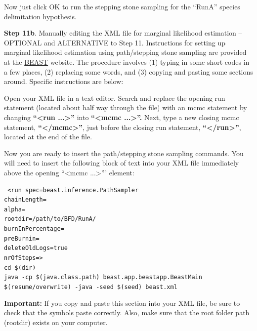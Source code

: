 {Now just click OK to run the stepping stone sampling for the ``RunA'' species delimitation hypothesis.

{\bf Step 11b}. Manually editing the XML file for marginal likelihood estimation -- OPTIONAL and ALTERNATIVE to Step 11. Instructions for setting up
marginal likelihood estimation using path/stepping stone sampling are provided at the \href{http://www.beast2.org/path-sampling/}{BEAST} website. The procedure involves (1) typing in some short codes in a few places, (2) replacing some words, and (3) copying and pasting some sections around. Specific instructions are below:
 
Open your XML file in a text editor. Search and replace the opening run statement (located about half way through the file) with an mcmc statement by changing {\bf ``<run ...>''} into {\bf ``<mcmc ...>''.} Next, type a new closing mcmc statement, {\bf ``</mcmc>''}, just before the closing run statement, {\bf ``</run>''}, located at the end of the file.

Now you are ready to insert the path/stepping stone sampling commands. You will need to insert the following block of text into your XML file immediately above the opening ``<mcmc ...>''' element:

\texttt{
<run spec=\textquotesingle beast.inference.PathSampler\textquotesingle \\
chainLength=\textquotedbl\\
alpha=\textquotesingle \\
rootdir=\textquotesingle /path/to/BFD/RunA/\textquotesingle \\
burnInPercentage=\textquotesingle \\
preBurnin=\textquotedbl\\
deleteOldLogs=\textquotesingle true\textquotesingle \\
nrOfSteps=\textquotesingle >\\
cd \$(dir)\\
java -cp \$(java.class.path) beast.app.beastapp.BeastMain \$(resume/overwrite) -java -seed \$(seed) beast.xml\\
}

{\bf Important:} If you copy and paste this section into your XML file, be sure to check that the symbols paste correctly. Also, make sure that the root folder path (rootdir) exists on your computer.

}
